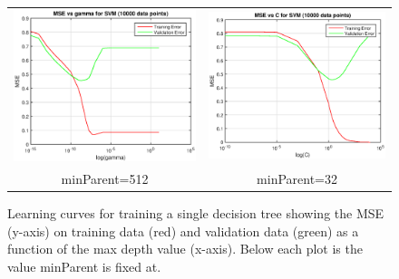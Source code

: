 \documentclass[12pt] {article}
\renewcommand{\baselinestretch}{1.5} %
\begin{document}
\renewcommand{\baselinestretch}{1.0} %
\begin{figure}[h!] \centering
\begin{tabular}{cc}
\includegraphics[width=.45\textwidth]{figdir/svmgamma10000.eps} &
\includegraphics[width=.45\textwidth]{figdir/svmc10000.eps} \\
minParent=512 & minParent=32 \\
\end{tabular}
\caption{Learning curves for training a single decision tree showing the MSE (y-axis) on training data (red) and validation data (green) as a function of the max depth value (x-axis). Below each plot is the value minParent is fixed at.}
\end{figure}
\renewcommand{\baselinestretch}{1.5} %
\end{document}
